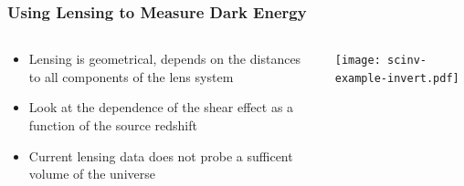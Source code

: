 \documentclass{beamer}
\begin{document}
\frame
{
    \frametitle{Using Lensing to Measure Dark Energy}

    \begin{columns}
        \begin{column}{0.5\textwidth}    
            \begin{itemize}

                \item Lensing is geometrical, depends on the distances to all
                    components of the lens system

                \item Look at the dependence of the shear effect as a function
                    of the source redshift
                    
                \item Current lensing data does not probe a sufficent volume of
                    the universe

            \end{itemize}
        \end{column}
        \begin{column}{0.5\textwidth}
            \begin{center}
                \texttt{[image: scinv-example-invert.pdf]}
            \end{center}
        \end{column}
    \end{columns}
}
\end{document}
